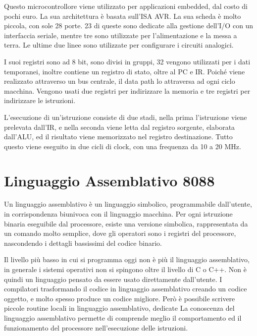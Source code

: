 \documentclass{article}
\numberwithin{equation}{subsection}
\begin{document}
Questo microcontrollore viene utilizzato per applicazioni embedded, dal costo di pochi euro. La sua architettura è basata sull'ISA AVR. La sua scheda è molto piccola, con sole 28 porte. 
23 di queste sono dedicate alla gestione dell'I/O con un interfaccia seriale, mentre tre sono utilizzate per l'alimentazione e la messa a terra. Le ultime due linee sono utilizzate per 
configurare i circuiti analogici. 


I suoi registri sono ad 8 bit, sono divisi in gruppi, 32 vengono utilizzati per i dati temporanei, inoltre contiene un registro di stato, oltre al PC e IR. 
Poiché viene realizzato attraverso un bus centrale, il data path lo attraversa ad ogni ciclo macchina. Vengono usati due registri per indirizzare la memoria e tre registri per indirizzare 
le istruzioni. 

L'esecuzione di un'istruzione consiste di due stadi, nella prima l'istruzione viene prelevata dall'IR, e nella seconda viene letta dal registro sorgente, elaborata dall'ALU, ed il 
risultato viene memorizzato nel registro destinazione. Tutto questo viene eseguito in due cicli di clock, con una frequenza da 10 a 20 MHz. 

\clearpage

\section{Linguaggio Assemblativo 8088}

Un linguaggio assemblativo è un linguaggio simbolico, programmabile dall'utente, in corrispondenza biunivoca con il linguaggio macchina. Per ogni istruzione binaria eseguibile 
dal processore, esiste una versione simbolica, rappresentata da un comando molto semplice, dove gli operatori sono i registri del processore, nascondendo i dettagli bassissimi 
del codice binario. 

Il livello più basso in cui si programma oggi non è più il linguaggio assemblativo, in generale i sistemi operativi non si spingono oltre il livello di C o C++. Non è quindi un 
linguaggio pensato da essere usato direttamente dall'utente. I compilatori trasformando il codice in linguaggio assemblativo creando un codice oggetto, e molto spesso produce 
un codice migliore. Però è possibile scrivere piccole routine locali in linguaggio assemblativo, dedicate
La conoscenza del linguaggio assemblativo permette di comprende meglio il comportamento ed il funzionamento del processore nell'esecuzione delle istruzioni. 
\end{document}
